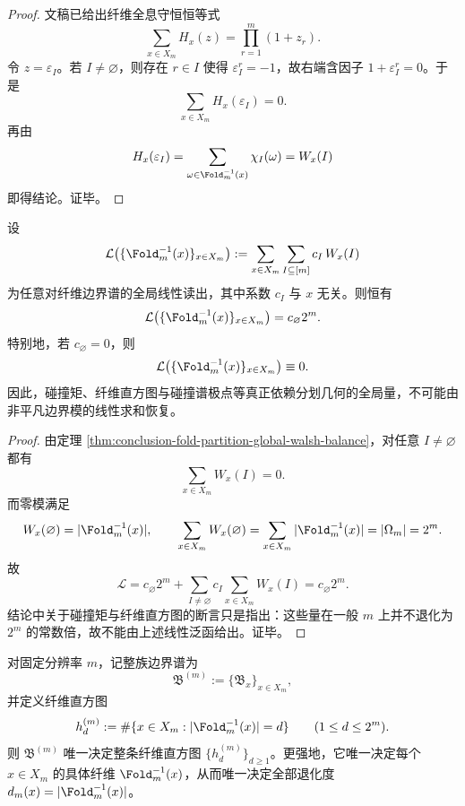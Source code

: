 \begin{proof}
文稿已给出纤维全息守恒恒等式
\[
\sum_{x\in X_m}H_x(z)=\prod_{r=1}^{m}(1+z_r).
\]
令 \(z=\varepsilon_I\)。若 \(I\neq \varnothing\)，则存在 \(r\in I\) 使得 \(\varepsilon_I^r=-1\)，故右端含因子 \(1+\varepsilon_I^r=0\)。于是
\[
\sum_{x\in X_m}H_x(\varepsilon_I)=0.
\]
再由
\[
H_x(\varepsilon_I)=\sum_{\omega\in \Fold_m^{-1}(x)}\chi_I(\omega)=W_x(I)
\]
即得结论。证毕。
\end{proof}

\begin{corollary}[边界线性读出的全局失明]\label{cor:conclusion-fold-boundary-linear-readout-global-blindness}
设
\[
\mathcal L\bigl(\{\Fold_m^{-1}(x)\}_{x\in X_m}\bigr)
:=
\sum_{x\in X_m}\sum_{I\subseteq [m]} c_I\,W_x(I)
\]
为任意对纤维边界谱的全局线性读出，其中系数 \(c_I\) 与 \(x\) 无关。则恒有
\[
\mathcal L\bigl(\{\Fold_m^{-1}(x)\}_{x\in X_m}\bigr)=c_{\varnothing}2^m.
\]
特别地，若 \(c_{\varnothing}=0\)，则
\[
\mathcal L\bigl(\{\Fold_m^{-1}(x)\}_{x\in X_m}\bigr)\equiv 0.
\]
因此，碰撞矩、纤维直方图与碰撞谱极点等真正依赖分划几何的全局量，不可能由非平凡边界模的线性求和恢复。
\end{corollary}

\begin{proof}
由定理 \ref{thm:conclusion-fold-partition-global-walsh-balance}，对任意 \(I\neq\varnothing\) 都有
\[
\sum_{x\in X_m}W_x(I)=0.
\]
而零模满足
\[
W_x(\varnothing)=|\Fold_m^{-1}(x)|,
\qquad
\sum_{x\in X_m}W_x(\varnothing)=\sum_{x\in X_m}|\Fold_m^{-1}(x)|=|\Omega_m|=2^m.
\]
故
\[
\mathcal L
=
c_{\varnothing}2^m+\sum_{I\neq\varnothing}c_I\sum_{x\in X_m}W_x(I)
=
c_{\varnothing}2^m.
\]
结论中关于碰撞矩与纤维直方图的断言只是指出：这些量在一般 \(m\) 上并不退化为 \(2^m\) 的常数倍，故不能由上述线性泛函给出。证毕。
\end{proof}

\begin{theorem}[边界全息到纤维直方图的精确重构]\label{thm:conclusion-fold-boundary-spectrum-fiber-histogram-reconstruction}
对固定分辨率 \(m\)，记整族边界谱为
\[
\mathfrak B^{(m)}:=\{\mathfrak B_x\}_{x\in X_m},
\]
并定义纤维直方图
\[
h_d^{(m)}:=\#\{x\in X_m:|\Fold_m^{-1}(x)|=d\}
\qquad (1\le d\le 2^m).
\]
则 \(\mathfrak B^{(m)}\) 唯一决定整条纤维直方图 \(\{h_d^{(m)}\}_{d\ge 1}\)。更强地，它唯一决定每个 \(x\in X_m\) 的具体纤维 \(\Fold_m^{-1}(x)\)，从而唯一决定全部退化度 \(d_m(x)=|\Fold_m^{-1}(x)|\)。
\end{theorem}

